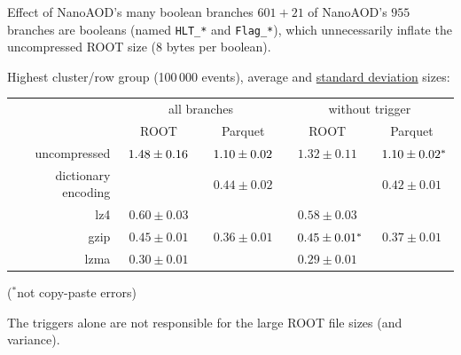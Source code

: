 \documentclass[aspectratio=169]{beamer}
\begin{document}
\begin{frame}{Effect of NanoAOD's many boolean branches}
\vspace{0.35 cm}
$601+21$ of NanoAOD's $955$ branches are booleans (named {\tt\small HLT\_*} and {\tt\small Flag\_*}), which unnecessarily inflate the uncompressed ROOT size (8 bytes per boolean).

\vspace{0.25 cm}
Highest cluster/row group (100\,000 events), average and \underline{standard deviation} sizes:

\renewcommand{\arraystretch}{1.2}

\begin{center}
\begin{tabular}{r c c | c c}
                    & \multicolumn{2}{c}{all branches} & \multicolumn{2}{c}{without trigger} \\
                    & ROOT            & Parquet         & ROOT            & Parquet          \\\hline
uncompressed        & $^{\textcolor{white}{*}}1.48 \pm 0.16^{\textcolor{white}{*}}$ & $^{\textcolor{white}{*}}1.10 \pm 0.02^{\textcolor{white}{*}}$ & $1.32 \pm 0.11$ & $^{\textcolor{white}{*}}1.10 \pm 0.02^*$  \\
dictionary encoding &                 & $0.44 \pm 0.02$ &                 & $0.42 \pm 0.01$  \\
lz4                 & $0.60 \pm 0.03$ &                 & $0.58 \pm 0.03$ &                  \\
gzip                & $0.45 \pm 0.01$ & $0.36 \pm 0.01$ & $^{\textcolor{white}{*}}0.45 \pm 0.01^*$ & $0.37 \pm 0.01$  \\
lzma                & $0.30 \pm 0.01$ &                 & $0.29 \pm 0.01$ &                  \\
\end{tabular}
\end{center}

\vspace{-0.1 cm}
\hfill {\scriptsize ($^*$not copy-paste errors)}

\vspace{0.2 cm}
The triggers alone are not responsible for the large ROOT file sizes (and variance).
\end{frame}
\end{document}
